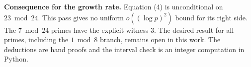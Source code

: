 \documentclass[11pt]{article}
\begin{document}
\textbf{Consequence for the growth rate.} Equation (4) is unconditional
on \(23\bmod24\). This pass gives no uniform \(o((\log p)^2)\) bound for
its right side. The \(7\bmod24\) primes have the explicit witness \(3\).
The desired result for all primes, including the \(1\bmod8\) branch,
remains open in this work. The deductions are hand proofs and the interval
check is an integer computation in Python.
\end{document}
